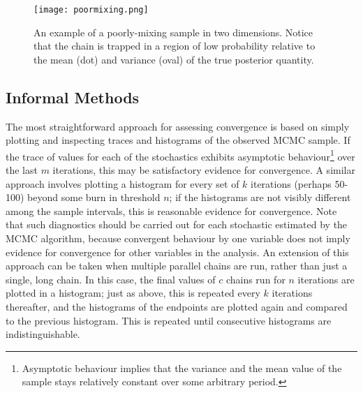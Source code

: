 \begin{figure}[ht]
\begin{center}
\texttt{[image: poormixing.png]}
\caption{An example of a poorly-mixing sample in two dimensions. Notice that the chain is trapped in a region of low probability relative to the mean (dot) and variance (oval) of the true posterior quantity.}
\label{fig:mix}
\end{center}
\end{figure}

\subsection*{Informal Methods}

The most straightforward approach for assessing convergence is based on
simply plotting and inspecting traces and histograms of the observed MCMC
sample. If the trace of values for each of the stochastics exhibits asymptotic
behaviour\footnote{Asymptotic behaviour implies that the variance and the
mean value of the sample stays relatively constant over some arbitrary
period.} over the last $m$ iterations, this may be satisfactory evidence
for convergence. A similar approach involves plotting a histogram for every
set of $k$ iterations (perhaps 50-100) beyond some burn in threshold $n$;
if the histograms are not visibly different among the sample intervals,
this is reasonable evidence for convergence. Note that such diagnostics
should be carried out for each stochastic estimated by the MCMC algorithm,
because convergent behaviour by one variable does not imply evidence for
convergence for other variables in the analysis. An extension of this approach
can be taken when multiple parallel chains are run, rather than just a
single, long chain. In this case, the final values of $c$ chains run for
$n$ iterations are plotted in a histogram; just as above, this is repeated
every $k$ iterations thereafter, and the histograms of the endpoints are
plotted again and compared to the previous histogram. This is repeated
until consecutive histograms are indistinguishable.

